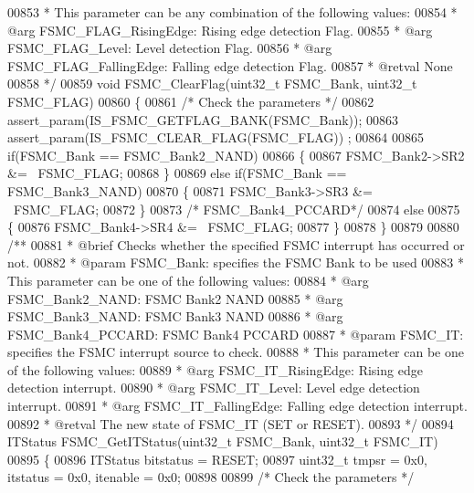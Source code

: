 \begin{DoxyCode}
00853 \textcolor{comment}{  *          This parameter can be any combination of the following values:}
00854 \textcolor{comment}{  *            @arg FSMC\_FLAG\_RisingEdge: Rising edge detection Flag.}
00855 \textcolor{comment}{  *            @arg FSMC\_FLAG\_Level: Level detection Flag.}
00856 \textcolor{comment}{  *            @arg FSMC\_FLAG\_FallingEdge: Falling edge detection Flag.}
00857 \textcolor{comment}{  * @retval None}
00858 \textcolor{comment}{  */}
00859 \textcolor{keywordtype}{void} FSMC_ClearFlag(uint32\_t FSMC\_Bank, uint32\_t FSMC\_FLAG)
00860 \{
00861  \textcolor{comment}{/* Check the parameters */}
00862   assert_param(IS\_FSMC\_GETFLAG\_BANK(FSMC\_Bank));
00863   assert_param(IS\_FSMC\_CLEAR\_FLAG(FSMC\_FLAG)) ;
00864 
00865   \textcolor{keywordflow}{if}(FSMC\_Bank == FSMC_Bank2_NAND)
00866   \{
00867     FSMC_Bank2->SR2 &= ~FSMC\_FLAG;
00868   \}
00869   \textcolor{keywordflow}{else} \textcolor{keywordflow}{if}(FSMC\_Bank == FSMC_Bank3_NAND)
00870   \{
00871     FSMC_Bank3->SR3 &= ~FSMC\_FLAG;
00872   \}
00873   \textcolor{comment}{/* FSMC\_Bank4\_PCCARD*/}
00874   \textcolor{keywordflow}{else}
00875   \{
00876     FSMC_Bank4->SR4 &= ~FSMC\_FLAG;
00877   \}
00878 \}
00879 
00880 \textcolor{comment}{/**}
00881 \textcolor{comment}{  * @brief  Checks whether the specified FSMC interrupt has occurred or not.}
00882 \textcolor{comment}{  * @param  FSMC\_Bank: specifies the FSMC Bank to be used}
00883 \textcolor{comment}{  *          This parameter can be one of the following values:}
00884 \textcolor{comment}{  *            @arg FSMC\_Bank2\_NAND: FSMC Bank2 NAND }
00885 \textcolor{comment}{  *            @arg FSMC\_Bank3\_NAND: FSMC Bank3 NAND}
00886 \textcolor{comment}{  *            @arg FSMC\_Bank4\_PCCARD: FSMC Bank4 PCCARD}
00887 \textcolor{comment}{  * @param  FSMC\_IT: specifies the FSMC interrupt source to check.}
00888 \textcolor{comment}{  *          This parameter can be one of the following values:}
00889 \textcolor{comment}{  *            @arg FSMC\_IT\_RisingEdge: Rising edge detection interrupt. }
00890 \textcolor{comment}{  *            @arg FSMC\_IT\_Level: Level edge detection interrupt.}
00891 \textcolor{comment}{  *            @arg FSMC\_IT\_FallingEdge: Falling edge detection interrupt. }
00892 \textcolor{comment}{  * @retval The new state of FSMC\_IT (SET or RESET).}
00893 \textcolor{comment}{  */}
00894 ITStatus FSMC_GetITStatus(uint32\_t FSMC\_Bank, uint32\_t FSMC\_IT)
00895 \{
00896   ITStatus bitstatus = RESET;
00897   uint32\_t tmpsr = 0x0, itstatus = 0x0, itenable = 0x0;
00898 
00899   \textcolor{comment}{/* Check the parameters */}

\end{DoxyCode}
